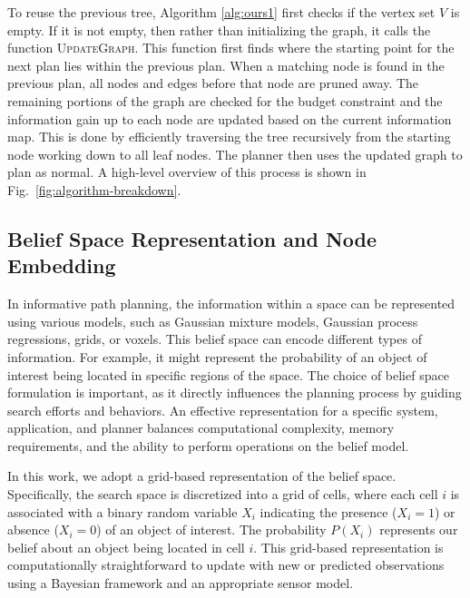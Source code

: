 To reuse the previous tree, Algorithm \ref{alg:ours1} first checks if the vertex set $V$ is empty. If it is not empty, then rather than initializing the graph, it calls the function \textsc{UpdateGraph}. This function first finds where the starting point for the next plan lies within the previous plan. When a matching node is found in the previous plan, all nodes and edges before that node are pruned away. The remaining portions of the graph are checked for the budget constraint and the information gain up to each node are updated based on the current information map. This is done by efficiently traversing the tree recursively from the starting node working down to all leaf nodes. The planner then uses the updated graph to plan as normal. A high-level overview of this process is shown in Fig.~\ref{fig:algorithm-breakdown}. 


\subsection{Belief Space Representation and Node Embedding}\label{sec:beliefspace}

In informative path planning, the information within a space can be represented using various models, such as Gaussian mixture models, Gaussian process regressions, grids, or voxels. This belief space can encode different types of information. For example, it might represent the probability of an object of interest being located in specific regions of the space. The choice of belief space formulation is important, as it directly influences the planning process by guiding search efforts and behaviors. An effective representation for a specific system, application, and planner balances computational complexity, memory requirements, and the ability to perform operations on the belief model.

In this work, we adopt a grid-based representation of the belief space. Specifically, the search space is discretized into a grid of cells, where each cell $i$ is associated with a binary random variable $X_i$ indicating the presence ($X_i=1$) or absence ($X_i=0$) of an object of interest. The probability $P(X_i)$ represents our belief about an object being located in cell $i$. This grid-based representation is computationally straightforward to update with new or predicted observations using a Bayesian framework and an appropriate sensor model.



